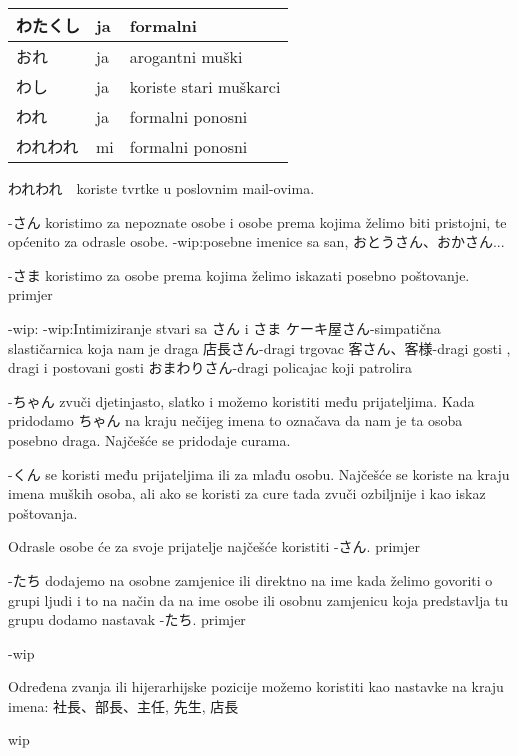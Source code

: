 	\begin{tabular}{|l|l|l|}
		\hline
		わたくし&ja&formalni\\\hline
		おれ&ja&arogantni muški\\\hline
		わし&ja&koriste stari muškarci\\\hline
		われ&ja&formalni ponosni\\\hline
		われわれ&mi&formalni ponosni\\\hline
	\end{tabular}

	\vspace{10pt}	
	
	われわれ　koriste tvrtke u poslovnim mail-ovima.
	
	


	-さん	koristimo za nepoznate osobe i osobe prema kojima želimo biti pristojni, te općenito za odrasle osobe.
	-wip:posebne imenice sa san, おとうさん、おかさん...
	
	-さま koristimo za osobe prema kojima želimo iskazati posebno poštovanje.
primjer

-wip:	-wip:Intimiziranje stvari sa さん i さま
ケーキ屋さん-simpatična slastičarnica koja nam je draga
店長さん-dragi trgovac
客さん、客様-dragi gosti , dragi i postovani gosti
おまわりさん-dragi policajac koji patrolira

	-ちゃん zvuči djetinjasto, slatko i možemo koristiti među prijateljima. Kada pridodamo ちゃん na kraju nečijeg imena to označava da nam je ta osoba posebno draga. Najčešće se pridodaje curama.

	-くん se koristi među prijateljima ili za mlađu osobu. Najčešće se koriste na kraju imena muških osoba, ali ako se koristi za cure tada zvuči ozbiljnije i kao iskaz poštovanja.

Odrasle osobe će za svoje prijatelje najčešće koristiti -さん.
primjer 

	-たち dodajemo na osobne zamjenice ili direktno na ime kada želimo govoriti o grupi ljudi i to na način da na ime osobe ili osobnu zamjenicu koja predstavlja tu grupu dodamo nastavak -たち.
primjer

	
	
	
	-wip
	
	Određena zvanja ili hijerarhijske pozicije možemo koristiti kao nastavke na kraju imena:
社長、部長、主任,  先生, 店長

wip
	
